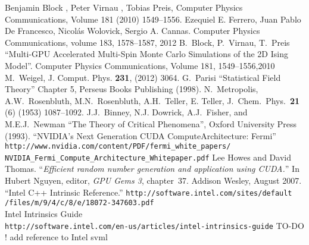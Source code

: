 \documentclass[a4paper]{llncs}
\begin{document}
\begin{thebibliography}{9}
Benjamin Block , Peter Virnau , Tobias Preis, Computer Physics Communications, Volume 181 (2010) 1549–1556.
Ezequiel E. Ferrero, Juan Pablo De Francesco, Nicolás Wolovick, Sergio A. Cannas. Computer Physics Communications, volume 183, 1578--1587, 2012
B.~Block, P.~Virnau, T.~Preis ``Multi-GPU Accelerated Multi-Spin Monte Carlo Simulations of the 2D Ising Model''. Computer Physics Communications, Volume 181, 1549--1556,2010
 M.~Weigel, J. Comput. Phys. \textbf{231},  (2012) 3064.
 G.~Parisi ``Statistical Field Theory'' Chapter 5, Perseus Books Publishing (1998).
N.~Metropolis, A.W.~Rosenbluth, M.N.~Rosenbluth, A.H.~Teller, E. Teller,
   J.~Chem.~Phys.~\textbf{21} (6) (1953) 1087--1092.
J.J.~Binney, N.J. Dowrick, A.J.~Fisher, and M.E.J.~Newman ``The Theory of Critical Phenomena'', Oxford University Press (1993).
``NVIDIA's Next Generation CUDA ComputeArchitecture: Fermi'' \\
\verb!http://www.nvidia.com/content/PDF/fermi_white_papers/!\\
\verb!NVIDIA_Fermi_Compute_Architecture_Whitepaper.pdf!
Lee Howes and David Thomas.
``{\em Efficient random number generation and application using {CUDA}.}''
In Hubert Nguyen, editor, {\em GPU Gems 3}, chapter~37. Addison
  Wesley, August 2007.
 ``Intel C++ Intrinsic Reference.'' 
\verb!http://software.intel.com/sites/default!\\\verb!/files/m/9/4/c/8/e/18072-347603.pdf! \\
Intel Intrinsics Guide\\ \verb!http://software.intel.com/en-us/articles/intel-intrinsics-guide!
 TO-DO ! add reference to Intel svml
\end{thebibliography}
\end{document}
